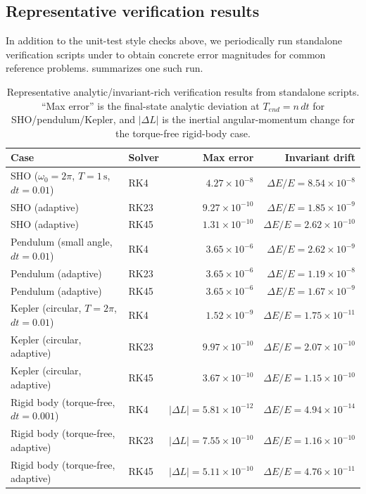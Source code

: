 \subsection{Representative verification results}
\label{sec:validation-results}

In addition to the unit-test style checks above, we periodically run standalone verification scripts under  to obtain concrete error magnitudes for common reference problems.  summarizes one such run.

\begin{table}[t]
  \centering
  \small
  \begin{tabular}{@{}llrr@{}}
    \toprule
    Case & Solver & Max error & Invariant drift \\
    \midrule
    SHO (\(\omega_0=2\pi\), \(T=1\,\mathrm{s}\), \(dt=0.01\)) & RK4  & $4.27\times 10^{-8}$  & $\Delta E/E=8.54\times 10^{-8}$ \\
    SHO (adaptive) & RK23 & $9.27\times 10^{-10}$ & $\Delta E/E=1.85\times 10^{-9}$ \\
    SHO (adaptive) & RK45 & $1.31\times 10^{-10}$ & $\Delta E/E=2.62\times 10^{-10}$ \\
    \midrule
    Pendulum (small angle, \(dt=0.01\)) & RK4  & $3.65\times 10^{-6}$ & $\Delta E/E=2.62\times 10^{-9}$ \\
    Pendulum (adaptive) & RK23 & $3.65\times 10^{-6}$ & $\Delta E/E=1.19\times 10^{-8}$ \\
    Pendulum (adaptive) & RK45 & $3.65\times 10^{-6}$ & $\Delta E/E=1.67\times 10^{-9}$ \\
    \midrule
    Kepler (circular, \(T=2\pi\), \(dt=0.01\)) & RK4  & $1.52\times 10^{-9}$ & $\Delta E/E=1.75\times 10^{-11}$ \\
    Kepler (circular, adaptive) & RK23 & $9.97\times 10^{-10}$ & $\Delta E/E=2.07\times 10^{-10}$ \\
    Kepler (circular, adaptive) & RK45 & $3.67\times 10^{-10}$ & $\Delta E/E=1.15\times 10^{-10}$ \\
    \midrule
    Rigid body (torque-free, \(dt=0.001\)) & RK4  & $|\Delta L|=5.81\times 10^{-12}$ & $\Delta E/E=4.94\times 10^{-14}$ \\
    Rigid body (torque-free, adaptive) & RK23 & $|\Delta L|=7.55\times 10^{-10}$ & $\Delta E/E=1.16\times 10^{-10}$ \\
    Rigid body (torque-free, adaptive) & RK45 & $|\Delta L|=5.11\times 10^{-10}$ & $\Delta E/E=4.76\times 10^{-11}$ \\
    \bottomrule
  \end{tabular}
  \caption{Representative analytic/invariant-rich verification results from standalone scripts. ``Max error'' is the final-state analytic deviation at \(T_{end}=n\,dt\) for SHO/pendulum/Kepler, and $|\Delta L|$ is the inertial angular-momentum change for the torque-free rigid-body case.}
  \label{tab:verification-analytic-results}
\end{table}

